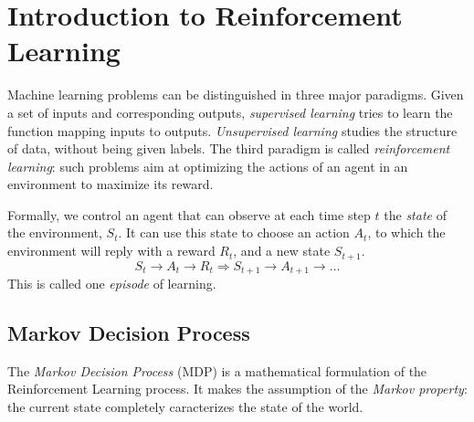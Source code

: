 \section{Introduction to Reinforcement Learning}
Machine learning problems can be distinguished in three major paradigms. Given a set of inputs and corresponding outputs, \emph{supervised learning} tries to learn the function mapping inputs to outputs. \emph{Unsupervised learning} studies the structure of data, without being given labels. The third paradigm is called \emph{reinforcement learning}: such problems aim at optimizing the actions of an agent in an environment to maximize its reward.

Formally, we control an agent that can observe at each time step $t$ the \emph{state} of the environment, $S_t$. It can use this state to choose an action $A_t$, to which the environment will reply with a reward $R_t$, and a new state $S_{t+1}$.
\begin{equation*}
    S_t\longrightarrow A_t\longrightarrow R_t \Longrightarrow S_{t+1}\longrightarrow A_{t+1} \longrightarrow \dots
\end{equation*}
This is called one \emph{episode} of learning.

\subsection{Markov Decision Process}
The \emph{Markov Decision Process} (MDP) is a mathematical formulation of the Reinforcement Learning process. It makes the assumption of the \emph{Markov property}: the current state completely caracterizes the state of the world.

